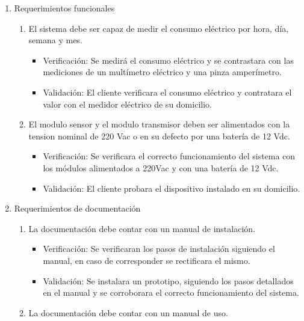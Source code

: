 \documentclass[
11pt, %
]{charter}
\begin{document}
\begin{enumerate}
	\item Requerimientos funcionales
		\begin{enumerate}

			\item El sistema debe ser capaz de medir el consumo eléctrico por hora, día, semana y mes.

			\begin{itemize}
			\item Verificación: Se medirá el consumo eléctrico y se contrastara con las mediciones de un multímetro eléctrico y una pinza amperímetro.
			\item Validación: El cliente verificara el consumo eléctrico y contratara el valor con el medidor eléctrico de su domicilio.
			\end{itemize}

	\item El modulo sensor y el modulo transmisor deben ser alimentados con la tension nominal de 220 Vac o en su defecto por una batería de 12 Vdc.
			
			\begin{itemize}
		\item Verificación: Se verificara el correcto funcionamiento del sistema con los módulos alimentados a 220Vac y con una batería de 12 Vdc.
			\item Validación: El cliente probara el dispositivo instalado en su domicilio.
			\end{itemize}
			
		\end{enumerate}
		
	\item Requerimientos de documentación
		\begin{enumerate}

		\item La documentación debe contar con un manual de instalación.
			
		\begin{itemize}
		\item Verificación: Se verificaran los pasos de instalación siguiendo el manual, en caso de  corresponder se rectificara el mismo. 
		\item Validación: Se instalara un prototipo, siguiendo los pasos detallados en el manual y se corroborara el correcto funcionamiento del sistema.
		\end{itemize}
			
		\item La documentación debe contar con un manual de uso.
		

\end{enumerate}
\end{enumerate}
\end{document}
